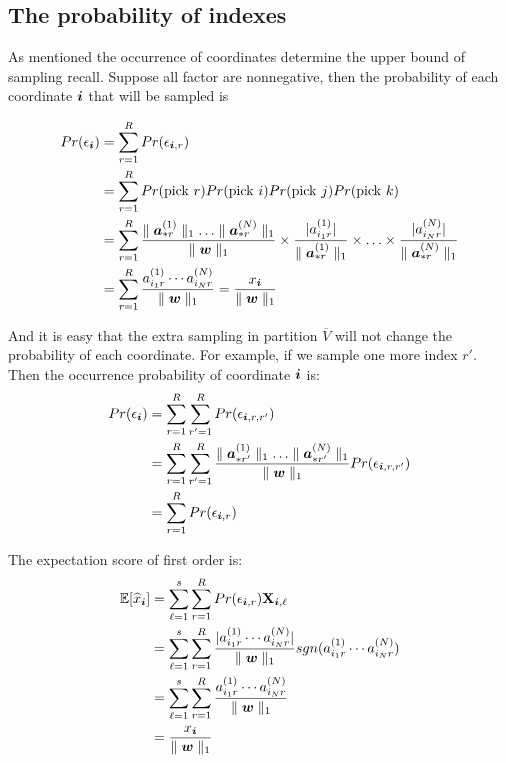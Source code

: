 \documentclass{article}
\newcommand{\Sca}[3]{{#1}^{(#2)}_{i_#2#3}}%
\newcommand{\V}[1]{{\bm{{\MakeLowercase{#1}}}}}
\newcommand{\Vacol}[1]{\V{a}^{(#1)}_{*r}}
\newcommand{\M}[1]{{\bm{\mathbf{\MakeUppercase{#1}}}}}
\newcommand{\norm}[2]{\parallel#1\parallel_{#2}}
\begin{document}
\subsection{The probability of indexes}

As mentioned the occurrence of coordinates determine the upper bound of sampling recall. Suppose all factor are nonnegative, then the probability of each coordinate $\V{i}$ that will be sampled is

\begin{align*}
Pr(\epsilon_{\V{i}}) &= \sum_{r=1}^{R} Pr(\epsilon_{\V{i},r})\\
&= \sum_{r=1}^{R} Pr({\rm pick\ }r)Pr({\rm pick\ }i)Pr({\rm pick\ }j)Pr({\rm pick\ }k)\\
&= \sum_{r=1}^{R} \frac{\norm{\Vacol{1}}{1}\ldots\norm{\Vacol{N}}{1}}{\norm{\V{W}}{1}}\times \frac{|\Sca{a}{1}{r}|}{\norm{\Vacol{1}}{1}} \times\ldots\times \frac{|\Sca{a}{N}{r}|}{\norm{\Vacol{N}}{1}} \\
& = \sum_{r=1}^{R} \frac{\Sca{a}{1}{r}\cdots\Sca{a}{N}{r}}{\norm{\V{W}}{1}} = \frac{x_{\V{i}}}{\norm{\V{w}}{1}}
\end{align*}

And it is easy that the extra sampling in partition $\overline{V}$ will not change the probability of each coordinate. For example, if we sample one more index $r'$. Then the occurrence probability of coordinate $\V{i}$ is:
\begin{align*}
Pr(\epsilon_{\V{i}}) &= \sum_{r=1}^{R} \sum_{r'=1}^{R} Pr(\epsilon_{\V{i},r,r'})\\
&= \sum_{r=1}^{R}\sum_{r'=1}^{R} \frac{\norm{\V{a}^{(1)}_{*r'}}{1}\ldots\norm{\V{a}^{(N)}_{*r'}}{1}}{\norm{\V{W}}{1}}Pr(\epsilon_{\V{i},r,r'})\\
&= \sum_{r=1}^{R}Pr(\epsilon_{\V{i},r})
\end{align*}

The expectation score of first order is:
\begin{align*}
\mathbb{E}[\widehat{x}_{\V{i}}]& =\sum_{\ell=1}^{s}\sum_{r=1}^{R} Pr(\epsilon_{\V{i},r})\M{X}_{\V{i},\ell}\\
& = \sum_{\ell=1}^{s}\sum_{r=1}^{R} \frac{|\Sca{a}{1}{r}\cdots\Sca{a}{N}{r}|}{\norm{\V{W}}{1}}sgn(\Sca{a}{1}{r}\cdots\Sca{a}{N}{r})\\
& = \sum_{\ell=1}^{s}\sum_{r=1}^{R} \frac{\Sca{a}{1}{r}\cdots\Sca{a}{N}{r}}{\norm{\V{W}}{1}}\\
& = \frac{x_{\V{i}}}{\norm{\V{w}}{1}}
\end{align*}
\end{document}
